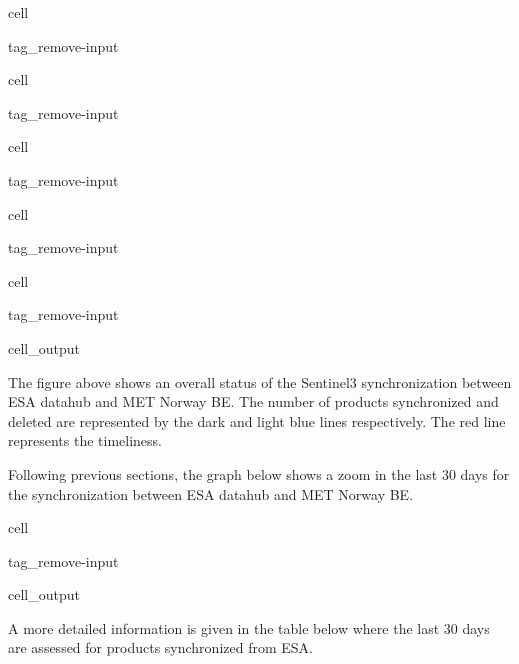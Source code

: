 \documentclass[letterpaper,10pt,english]{jupyterBook}
\begin{document}
\begin{sphinxuseclass}{cell}
\begin{sphinxuseclass}{tag_remove-input}
\end{sphinxuseclass}
\end{sphinxuseclass}
\begin{sphinxuseclass}{cell}
\begin{sphinxuseclass}{tag_remove-input}
\end{sphinxuseclass}
\end{sphinxuseclass}
\begin{sphinxuseclass}{cell}
\begin{sphinxuseclass}{tag_remove-input}
\end{sphinxuseclass}
\end{sphinxuseclass}
\begin{sphinxuseclass}{cell}
\begin{sphinxuseclass}{tag_remove-input}
\end{sphinxuseclass}
\end{sphinxuseclass}
\begin{sphinxuseclass}{cell}
\begin{sphinxuseclass}{tag_remove-input}\begin{sphinxVerbatimOutput}

\begin{sphinxuseclass}{cell_output}
\noindent{}

\end{sphinxuseclass}\end{sphinxVerbatimOutput}

\end{sphinxuseclass}
\end{sphinxuseclass}
\sphinxAtStartPar
The figure above shows an overall status of the Sentinel\sphinxhyphen{}3 synchronization between ESA datahub and MET Norway BE. The number of products synchronized and deleted are represented by the dark and light blue lines respectively. The red line represents the timeliness.

\sphinxAtStartPar
Following previous sections, the graph below shows a zoom in the last 30 days for the synchronization between ESA datahub and MET Norway BE.

\begin{sphinxuseclass}{cell}
\begin{sphinxuseclass}{tag_remove-input}\begin{sphinxVerbatimOutput}

\begin{sphinxuseclass}{cell_output}
\noindent{}

\end{sphinxuseclass}\end{sphinxVerbatimOutput}

\end{sphinxuseclass}
\end{sphinxuseclass}
\sphinxAtStartPar
A more detailed information is given in the table below where the last 30 days are assessed for products synchronized from ESA.
\end{document}
